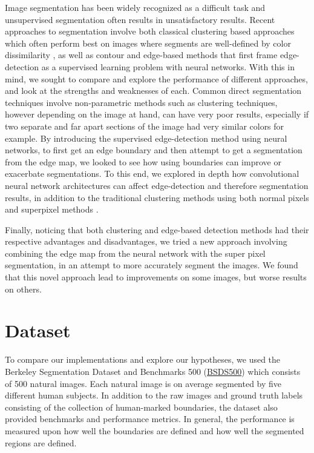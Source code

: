 \documentclass[10pt, twocolumn, twoside]{article}
\newcommand{\squeezeup}{\vspace{-2.5mm}}
\begin{document}
Image segmentation has been widely recognized as a difficult task \cite{Arbelaez, Kaur} and unsupervised segmentation often results in unsatisfactory results. Recent approaches to segmentation involve both classical clustering based approaches which often perform best on images where segments are well-defined by color dissimilarity \cite{Arbelaez}, as well as contour and edge-based methods that first frame edge-detection as a supervised learning problem with neural networks\cite{El-Sayed}. With this in mind, we sought to compare and explore the performance of different approaches, and look at the strengths and weaknesses of each. Common direct segmentation techniques involve non-parametric methods such as clustering techniques, however depending on the image at hand, can have very poor results, especially if two separate and far apart sections of the image had very similar colors for example. By introducing the supervised edge-detection method using neural networks, to first get an edge boundary and then attempt to get a segmentation from the edge map, we looked to see how using boundaries can improve or exacerbate segmentations. To this end, we explored in depth how convolutional neural network architectures can affect edge-detection and therefore segmentation results, in addition to the traditional clustering methods using both normal pixels and superpixel methods \cite{Bergh}. 

Finally, noticing that both clustering and edge-based detection methods had their respective advantages and disadvantages, we tried a new approach involving combining the edge map from the neural network with the super pixel segmentation, in an attempt to more accurately segment the images. We found that this novel approach lead to improvements on some images, but worse results on others.

\section{Dataset}
\squeezeup
\squeezeup
To compare our implementations and explore our hypotheses, we used the Berkeley Segmentation Dataset and Benchmarks 500 (\href{https://www2.eecs.berkeley.edu/Research/Projects/CS/vision/grouping/resources.html}{BSDS500}) which consists of 500 natural images. Each natural image is on average segmented by five different human subjects. In addition to the raw images and ground truth labels consisting of the collection of human-marked boundaries, the dataset also provided benchmarks and performance metrics. In general, the performance is measured upon how well the boundaries are defined and how well the segmented regions are defined. 
\end{document}
